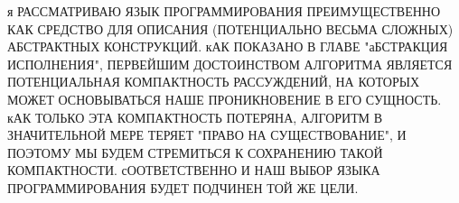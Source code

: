 я РАССМАТРИВАЮ ЯЗЫК ПРОГРАММИРОВАНИЯ ПРЕИМУЩЕСТВЕННО
КАК СРЕДСТВО ДЛЯ ОПИСАНИЯ (ПОТЕНЦИАЛЬНО ВЕСЬМА
СЛОЖНЫХ) АБСТРАКТНЫХ КОНСТРУКЦИЙ. кАК ПОКАЗАНО В
ГЛАВЕ "аБСТРАКЦИЯ ИСПОЛНЕНИЯ", ПЕРВЕЙШИМ
ДОСТОИНСТВОМ АЛГОРИТМА ЯВЛЯЕТСЯ ПОТЕНЦИАЛЬНАЯ
КОМПАКТНОСТЬ РАССУЖДЕНИЙ, НА КОТОРЫХ МОЖЕТ
ОСНОВЫВАТЬСЯ НАШЕ ПРОНИКНОВЕНИЕ В ЕГО СУЩНОСТЬ. кАК
ТОЛЬКО ЭТА КОМПАКТНОСТЬ ПОТЕРЯНА, АЛГОРИТМ В
ЗНАЧИТЕЛЬНОЙ МЕРЕ ТЕРЯЕТ "ПРАВО НА СУЩЕСТВОВАНИЕ",
И ПОЭТОМУ МЫ БУДЕМ СТРЕМИТЬСЯ К СОХРАНЕНИЮ ТАКОЙ
КОМПАКТНОСТИ. сООТВЕТСТВЕННО И НАШ ВЫБОР ЯЗЫКА
ПРОГРАММИРОВАНИЯ БУДЕТ ПОДЧИНЕН ТОЙ ЖЕ ЦЕЛИ.

\bye
